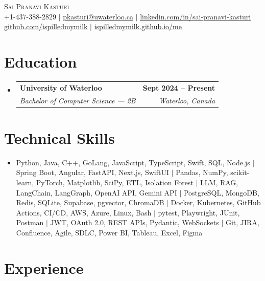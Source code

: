 \documentclass[letterpaper,10pt]{article}
\makeatletter
\newcommand{\resumeSubheading}[4]{
  \vspace{-1pt}\item
    \begin{tabular*}{1.0\textwidth}[t]{l@{\extracolsep{\fill}}r}
      \textbf{#1} & \textbf{\small #2} \\
      \textit{\small#3} & \textit{\small #4} \\[-2pt]
    \end{tabular*}\vspace{-7pt}
}
\newcommand{\resumeSubHeadingListStart}{\begin{itemize}[leftmargin=0.0in, label={}]}
\newcommand{\resumeSubHeadingListEnd}{\end{itemize}}
\makeatother
\begin{document}

\vspace{-28pt}
\begin{center}
    {\Huge \scshape Sai Pranavi Kasturi} \\
    \small +1-437-388-2829 $|$ \underline{pkasturi@uwaterloo.ca} $|$
    \href{https://linkedin.com/in/sai-pranavi-kasturi-704807298}{\underline{linkedin.com/in/sai-pranavi-kasturi}} $|$
    \href{https://github.com/ispilledmymilk}{\underline{github.com/ispilledmymilk}} $|$
    \href{https://ispilledmymilk.github.io/me/}{\underline{ispilledmymilk.github.io/me}}
    \vspace{-10pt}
\end{center}

\vspace{-10pt}
\section{Education}
  \resumeSubHeadingListStart
    \resumeSubheading
      {University of Waterloo}{Sept 2024 -- Present}
      {Bachelor of Computer Science --- 2B}{Waterloo, Canada}
  \resumeSubHeadingListEnd
\vspace{-8pt}

\section{Technical Skills}
\begin{itemize}[leftmargin=0.05in, label={}]
  \small\item{
    Python, Java, C++, GoLang, JavaScript, TypeScript, Swift, SQL, Node.js $|$ Spring Boot, Angular, FastAPI, Next.js, SwiftUI $|$ Pandas, NumPy, scikit-learn, PyTorch, Matplotlib, SciPy, ETL, Isolation Forest $|$ LLM, RAG, LangChain, LangGraph, OpenAI API, Gemini API $|$ PostgreSQL, MongoDB, Redis, SQLite, Supabase, pgvector, ChromaDB $|$ Docker, Kubernetes, GitHub Actions, CI/CD, AWS, Azure, Linux, Bash $|$ pytest, Playwright, JUnit, Postman $|$ JWT, OAuth 2.0, REST APIs, Pydantic, WebSockets $|$ Git, JIRA, Confluence, Agile, SDLC, Power BI, Tableau, Excel, Figma
  }
\end{itemize}
\vspace{-18pt}

\vspace{1.20pt}
\section{Experience}
\end{document}
